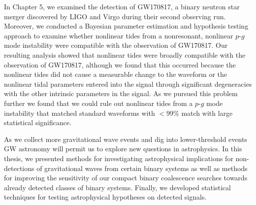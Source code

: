 In Chapter 5, we examined the detection of GW170817, a binary neutron star merger discovered by LIGO and Virgo during their second observing run. Moreover, we conducted a Bayesian parameter estimation and hypothesis testing approach to examine whether nonlinear tides from a nonresonant, nonlinear $p$-$g$ mode instability were compatible with the observation of GW170817. Our resulting analysis showed that nonlinear tides were broadly compatible with the observation of GW170817, although we found that this occurred because the nonlinear tides did not cause a measurable change to the waveform or the nonlinear tidal parameters entered into the signal through significant degeneracies with the other intrinsic parameters in the signal. As we pursued this problem further we found that we could rule out nonlinear tides from a $p$-$g$ mode instability that matched standard waveforms with $< 99 \%$ match with large statistical significance.

As we collect more gravitational wave events and dig into lower-threshold events GW astronomy will permit us to explore new questions in astrophysics. In this thesis, we presented methods for investigating astrophysical implications for non-detections of gravitational waves from certain binary systems as well as methods for improving the sensitivity of our compact binary coalescence searches towards already detected classes of binary systems. Finally, we developed statistical techniques for testing astrophysical hypotheses on detected signals.
